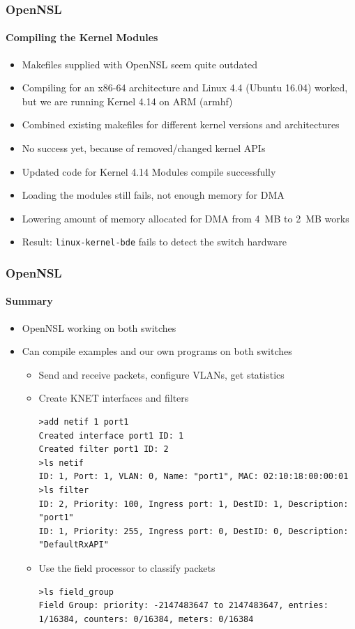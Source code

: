 \documentclass[12pt]{beamer}
\begin{document}
\begin{frame}
\frametitle{OpenNSL}
\framesubtitle{Compiling the Kernel Modules}
\begin{itemize}
    \item Makefiles supplied with OpenNSL seem quite outdated
    \item Compiling for an x86-64 architecture and Linux 4.4 (Ubuntu 16.04) worked, but we are running Kernel 4.14 on ARM (armhf)
    \pause
    \item Combined existing makefiles for different kernel versions and architectures
    \item No success yet, because of removed/changed kernel APIs
    \pause
    \item Updated code for Kernel 4.14 \textrightarrow Modules compile successfully
    \pause
    \item Loading the modules still fails, not enough memory for DMA
    \item Lowering amount of memory allocated for DMA from 4~MB to 2~MB works
    \pause
    \item Result: \texttt{linux-kernel-bde} fails to detect the switch hardware
\end{itemize}
\end{frame}

\begin{frame}[fragile]
\frametitle{OpenNSL}
\framesubtitle{Summary}
\begin{itemize}
    \item OpenNSL working on both switches
    \item Can compile examples and our own programs on both switches
    \begin{itemize}
        \item Send and receive packets, configure VLANs, get statistics
        \item Create KNET interfaces and filters
\begin{lstlisting}
>add netif 1 port1
Created interface port1 ID: 1
Created filter port1 ID: 2
>ls netif
ID: 1, Port: 1, VLAN: 0, Name: "port1", MAC: 02:10:18:00:00:01
>ls filter
ID: 2, Priority: 100, Ingress port: 1, DestID: 1, Description: "port1"
ID: 1, Priority: 255, Ingress port: 0, DestID: 0, Description: "DefaultRxAPI"
\end{lstlisting}
        \item Use the field processor to classify packets
\begin{lstlisting}
>ls field_group
Field Group: priority: -2147483647 to 2147483647, entries: 1/16384, counters: 0/16384, meters: 0/16384
\end{lstlisting}
    \end{itemize}
\end{itemize}
\end{frame}
\end{document}
